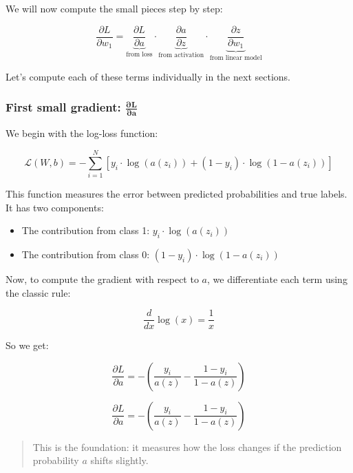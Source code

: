 \documentclass[11pt]{article}
\begin{document}
\vspace{1em}

We will now compute the small pieces step by step:

\[
\boxed{
\frac{\partial L}{\partial w_1} = 
\underbrace{\frac{\partial L}{\partial a}}_{\text{from loss}} \cdot 
\underbrace{\frac{\partial a}{\partial z}}_{\text{from activation}} \cdot 
\underbrace{\frac{\partial z}{\partial w_1}}_{\text{from linear model}}
}
\]

\vspace{1em}

Let's compute each of these terms individually in the next sections.


\subsubsection*{First small gradient: $\boldsymbol{\frac{\partial L}{\partial a}}$}

We begin with the log-loss function:

\[
\mathcal{L}(W, b) = - \sum_{i=1}^{N} \left[ y_i \cdot \log(a(z_i)) + (1 - y_i) \cdot \log(1 - a(z_i)) \right]
\]

This function measures the error between predicted probabilities and true labels. It has two components:
\begin{itemize}
    \item The contribution from class 1: \( y_i \cdot \log(a(z_i)) \)
    \item The contribution from class 0: \( (1 - y_i) \cdot \log(1 - a(z_i)) \)
\end{itemize}

Now, to compute the gradient with respect to \( a \), we differentiate each term using the classic rule:

\[
\frac{d}{dx} \log(x) = \frac{1}{x}
\]

So we get:

\[
\frac{\partial L}{\partial a} = - \left( \frac{y_i}{a(z)} - \frac{1 - y_i}{1 - a(z)} \right)
\]

\vspace{0.5em}

\begin{tcolorbox}[colback=gray!3, colframe=gray!40!black]
\[
\boxed{ \frac{\partial L}{\partial a} = - \left( \frac{y_i}{a(z)} - \frac{1 - y_i}{1 - a(z)} \right) }
\]
\end{tcolorbox}

\begin{quote}
This is the foundation: it measures how the loss changes if the prediction probability $a$ shifts slightly.
\end{quote}
\end{document}
